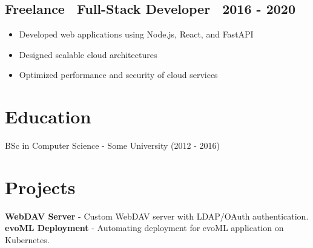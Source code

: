 \documentclass[a4paper,10pt]{article}
\begin{document}
\subsection*{Freelance \textbar\ Full-Stack Developer \textbar\ 2016 - 2020}
\begin{itemize}[left=0pt, label=]
    \item Developed web applications using Node.js, React, and FastAPI
    \item Designed scalable cloud architectures
    \item Optimized performance and security of cloud services
\end{itemize}

\vspace{10pt}

\section*{ Education}
BSc in Computer Science - Some University (2012 - 2016)

\vspace{10pt}

\section*{ Projects}
\textbf{ WebDAV Server} - Custom WebDAV server with LDAP/OAuth authentication.\\
\textbf{ evoML Deployment} - Automating deployment for evoML application on Kubernetes.
\end{document}
